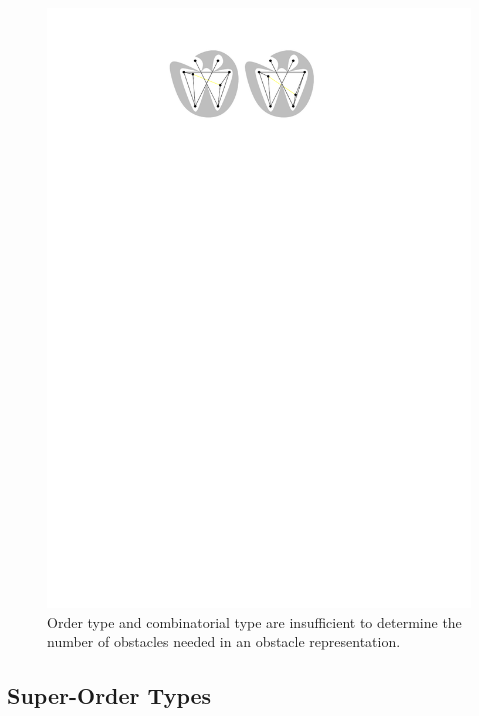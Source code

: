 \documentclass{patmorin}
\begin{document}
\begin{figure}
  \begin{center}
    \includegraphics{order-type}
  \end{center}
  \caption{Order type and combinatorial type are insufficient to determine 
      the number of obstacles needed in an obstacle representation.}
\end{figure}

\subsection{Super-Order Types}
\end{document}
